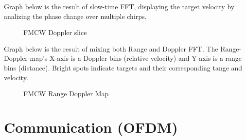 \documentclass[conference]{IEEEtran}
\begin{document}
Graph below is the result of slow-time FFT, displaying the target velocity by analizing the phase change over multiple chirps. 

	\begin{figure}[H]
	    		\centering
	    		\caption{FMCW Doppler slice}
		\end{figure}
	
Graph below is the result of mixing both Range and Doppler FFT. The Range-Doppler map's X-axis is a Doppler bins (relative velocity) and Y-axis is a range bins (distance). Bright spots indicate targets and their corresponding tange and velocity.
	\begin{figure}[H]
	    		\centering
	    		\caption{FMCW Range Doppler Map}
		\end{figure}
		
		
     \section {Communication (OFDM)}
     
\end{document}
